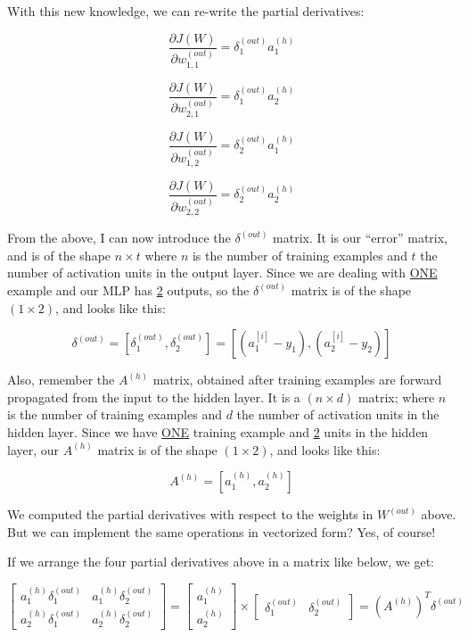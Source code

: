 \documentclass[12pt, letterpaper]{article}
\begin{document}
\vspace{5mm} %

With this new knowledge, we can re-write the partial derivatives:

\[
    \frac{\partial J(W)}{\partial w_{1,1}^{(out)}} =
    \delta_1^{(out)} a_1^{(h)}
\]

\[
    \frac{\partial J(W)}{\partial w_{2,1}^{(out)}} =
    \delta_1^{(out)} a_2^{(h)}
\]

\[
    \frac{\partial J(W)}{\partial w_{1,2}^{(out)}} =
    \delta_2^{(out)} a_1^{(h)}
\]

\[
    \frac{\partial J(W)}{\partial w_{2,2}^{(out)}} =
    \delta_2^{(out)} a_2^{(h)}
\]

From the above, I can now introduce the $\delta^{(out)}$ matrix.
It is our ``error'' matrix, and is of the shape $n \times t$ 
where $n$ is the number of training examples and $t$ the number 
of activation units in the output layer. Since we are dealing with
\underline{ONE} example and our MLP has \underline{2} outputs, so 
the $\delta^{(out)}$ matrix is of the shape $(1 \times 2)$, and 
looks like this:

\[
    \delta^{(out)} = [\delta_1^{(out)}, \delta_2^{(out)}] =
    [(a_{1}^{[i]} - y_1), (a_{2}^{[i]} - y_2)]
\]

\vspace{5mm} %

Also, remember the $A^{(h)}$ matrix, obtained after training
examples are forward propagated from the input to the hidden layer.
It is a $(n \times d)$ matrix; where $n$ is the number of training
examples and $d$ the number of activation units in the hidden layer.
Since we have \underline{ONE} training example and \underline{2}
units in the hidden layer, our $A^{(h)}$ matrix is of the shape
$(1 \times 2)$, and looks like this:

\[
    A^{(h)} = [a_1^{(h)}, a_2^{(h)}]
\]

We computed the partial derivatives with respect to the weights in
$W^{(out)}$ above. But we can implement the same operations in 
vectorized form? Yes, of course!

\vspace{5mm} %

If we arrange the four partial derivatives above in a matrix like
below, we get:

\[
    \begin{bmatrix}
        a_1^{(h)} \delta_1^{(out)} & a_1^{(h)} \delta_2^{(out)} \\
        a_2^{(h)} \delta_1^{(out)} & a_2^{(h)} \delta_2^{(out)}
    \end{bmatrix}
    =
    \begin{bmatrix}
        a_1^{(h)} \\
        a_2^{(h)}
    \end{bmatrix}
    \times
    \begin{bmatrix}
        \delta_1^{(out)} & \delta_2^{(out)}
    \end{bmatrix}
    = 
    (A^{(h)})^{T} \delta^{(out)}
\]
\end{document}
